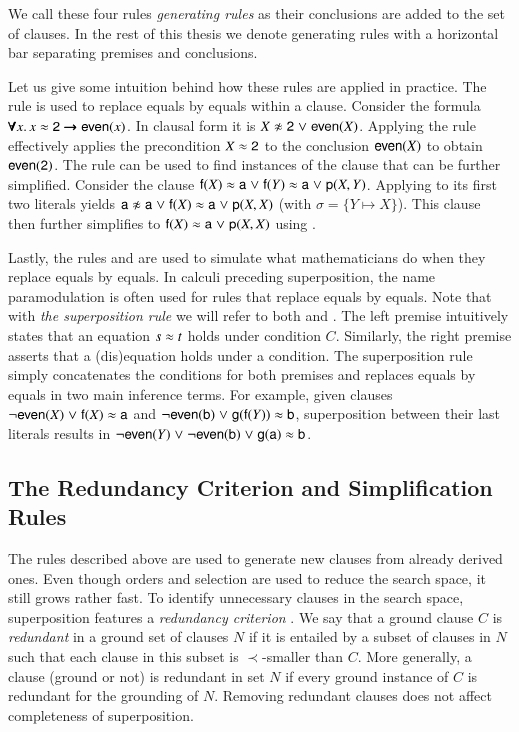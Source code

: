 \medskip
We call these four rules \emph{generating rules} as their conclusions are added to
the set of clauses. In the rest of this thesis we denote generating rules with a
horizontal bar separating premises and conclusions.

Let us give some intuition behind how these rules are applied in practice. The
 rule is used to replace equals by equals within a clause.
Consider the formula $\pmb{\forall} x.\,  x \approx \mathsf{2} \pmb{\rightarrow} \mathsf{even}(x)$. In
clausal form it is $X \noteq \cst{2} \llor \cst{even}(X)$. Applying the
 rule effectively applies the precondition $X \approx \mathsf{2}$ to the
conclusion $\mathsf{even}(X)$ to obtain $\mathsf{even}(\mathsf{2})$. The 
rule can be used to find instances of the clause that can be further simplified.
Consider the clause $\mathsf{f}(X) \approx \mathsf{a} \mathrel\lor \mathsf{f}(Y) \approx \mathsf{a} \mathrel\lor
\mathsf{p}(X, Y)$. Applying  to its first two literals yields $\cst{a}
\noteq \cst{a} \llor \cst{f}(X) \eq \cst{a} \llor \cst{p}(X, X)$ (with $\sigma = \{ Y \mapsto X \}$). This clause
then further simplifies to $\mathsf{f}(X) \approx \mathsf{a} \mathrel\lor \mathsf{p}(X, X)$ using .

Lastly, the rules  and  are used to simulate what
mathematicians do when they replace equals by equals. In calculi preceding
superposition, the name paramodulation is often used for rules that replace
equals by equals. Note that with \emph{the superposition rule} we will refer to both
 and . The left premise intuitively states that
an equation $s \approx t$ holds under condition $C$. Similarly, the right premise
asserts that a (dis)equation holds under a condition. The superposition rule
simply concatenates the conditions for both premises and replaces equals by
equals in two main inference terms. For example, given clauses $\neg
\mathsf{even}(X) \mathrel\lor \mathsf{f}(X) \approx \mathsf{a}$ and $\neg \mathsf{even}(\mathsf{b}) \mathrel\lor
\mathsf{g}(\mathsf{f}(Y)) \approx \mathsf{b}$, superposition between their last literals
results in $\neg \mathsf{even}(Y) \mathrel\lor \neg \mathsf{even}(\mathsf{b}) \mathrel\lor
\mathsf{g}(\mathsf{a}) \approx \mathsf{b}$.

\medskip

\subsection{The Redundancy Criterion and Simplification Rules}

The rules described above are used to generate new clauses from already derived
ones. Even though orders and selection are used to reduce the search space,
it still grows rather fast. To identify unnecessary clauses in the search
space, superposition features a \emph{redundancy criterion}
\cite[Sect.~4.2.2]{bg-01-resolution}. We say that a ground clause $C$ is
{\em redundant} in a ground set of clauses $N$ if it is entailed by a subset of
clauses in $N$ such that each clause in this subset is $\prec$-smaller than $C$. More
generally, a clause (ground or not) is redundant in set $N$ if every ground
instance of $C$ is redundant for the grounding of $N$. Removing redundant
clauses does not affect completeness of superposition.

